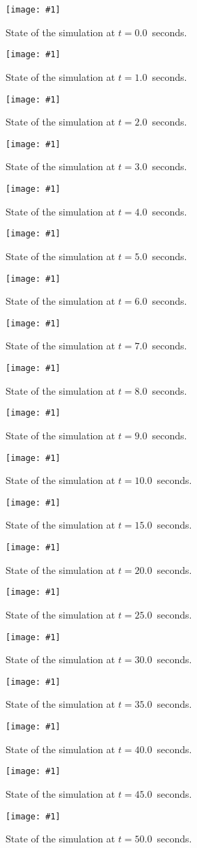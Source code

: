 \documentclass[11pt, oneside]{article}   	%
\newcommand{\TheTimeStep}[3]{%
\begin{figure}[p]
	\centering
	\texttt{[image: \#1]}
	\caption{State of the simulation at $t = #2$~seconds.}
	\label{fig:#3}
\end{figure}}
\begin{document}
\TheTimeStep{32x32/Stream000.png}{0.0}{100}
\TheTimeStep{32x32/Stream002.png}{1.0}{102}
\TheTimeStep{32x32/Stream004.png}{2.0}{104}
\TheTimeStep{32x32/Stream006.png}{3.0}{106}
\TheTimeStep{32x32/Stream008.png}{4.0}{108}
\TheTimeStep{32x32/Stream010.png}{5.0}{110}
\TheTimeStep{32x32/Stream012.png}{6.0}{112}
\TheTimeStep{32x32/Stream014.png}{7.0}{114}
\TheTimeStep{32x32/Stream016.png}{8.0}{116}
\TheTimeStep{32x32/Stream018.png}{9.0}{118}
\TheTimeStep{32x32/Stream020.png}{10.0}{120}

\TheTimeStep{32x32/Stream021.png}{15.0}{021}
\TheTimeStep{32x32/Stream022.png}{20.0}{022}
\TheTimeStep{32x32/Stream023.png}{25.0}{023}
\TheTimeStep{32x32/Stream024.png}{30.0}{024}
\TheTimeStep{32x32/Stream025.png}{35.0}{025}
\TheTimeStep{32x32/Stream026.png}{40.0}{026}
\TheTimeStep{32x32/Stream027.png}{45.0}{027}
\TheTimeStep{32x32/Stream028.png}{50.0}{028}
\end{document}
